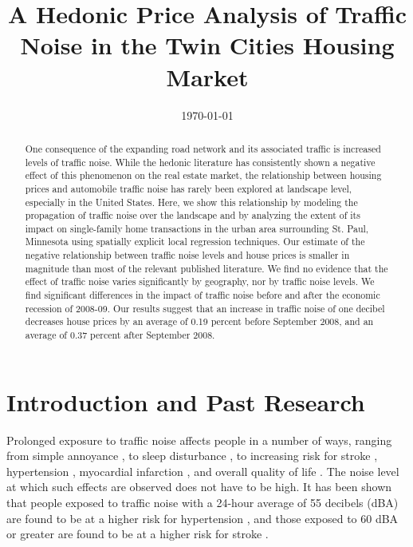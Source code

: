 \documentclass{article}\usepackage{graphicx, color}
\title{A Hedonic Price Analysis of Traffic Noise in the Twin Cities Housing Market}
\date{\today}
\begin{document}
\maketitle
\begin{singlespace}
\begin{abstract}
One consequence of the expanding road network and its associated traffic is increased levels of traffic noise.  While the hedonic literature has consistently shown a negative effect of this phenomenon on the real estate market, the relationship between housing prices and automobile traffic noise has rarely been explored at landscape level, especially in the United States. Here, we show this relationship by modeling the propagation of traffic noise over the landscape and by analyzing the extent of its impact on single-family home transactions in the urban area surrounding St. Paul, Minnesota using spatially explicit local regression techniques. Our estimate of the negative relationship between traffic noise levels and house prices is smaller in magnitude than most of the relevant published literature. We find no evidence that the effect of traffic noise varies significantly by geography, nor by traffic noise levels.  We find significant differences in the impact of traffic noise before and after the economic recession of 2008-09. Our results suggest that an increase in traffic noise of one decibel decreases house prices by an average of 0.19 percent before September 2008, and an average of 0.37 percent after September 2008.
\end{abstract}
\end{singlespace}

\section{Introduction and Past Research}\label{sec:lit}
Prolonged exposure to traffic noise affects people in a number of ways, ranging from simple annoyance \citep{Miedema2001, Ouis2001, Ohrstrom2007, DeKluizenaar2013, Weinhold2013}, to sleep disturbance , to increasing risk for stroke \citep{Sorensen2011}, hypertension \citep{Jarup2008, Bodin2009}, myocardial infarction \citep{Babisch2005}, and overall quality of life \citep{Shepherd2013}. The noise level at which such effects are observed does not have to be high.  It has been shown that people exposed to traffic noise with a 24-hour average of 55 decibels (dBA) are found to be at a higher risk for hypertension \citep{Barregard2009, Bodin2009}, and those exposed to 60 dBA or greater are found to be at a higher risk for stroke \citep{Sorensen2011}.  
\end{document}
